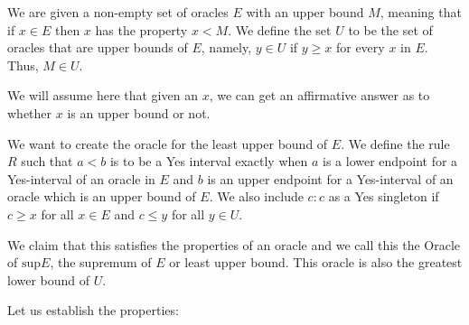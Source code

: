 \documentclass[12pt]{article}
\begin{document}
We are given a non-empty set of oracles $E$ with an upper bound $M$, meaning that if $x \in E$ then $x$ has the property $x < M$. We define the set $U$ to be the set of oracles that are upper bounds of $E$, namely, $y \in U$ if $y \geq x$ for every $x$ in $E$.  Thus, $M \in U$.

We will assume here that given an $x$, we can get an affirmative answer as to whether $x$ is an upper bound or not. 

We want to create the oracle for the least upper bound of $E$. We define the rule $R$ such that $a\lt b$ is to be a Yes interval exactly when $a$ is a lower endpoint for a Yes-interval of an oracle in $E$ and $b$ is an upper endpoint for a Yes-interval of an oracle which is an upper bound of $E$. We also include $c:c$ as a Yes singleton if $c \geq x$ for all $x \in E$ and $c \leq y$ for all $y\in U$.

We claim that this satisfies the properties of an oracle and we call this the Oracle of $\mathrm{sup} E$, the supremum of $E$ or least upper bound. This oracle is also the greatest lower bound of $U$.

Let us establish the properties: 
\end{document}
